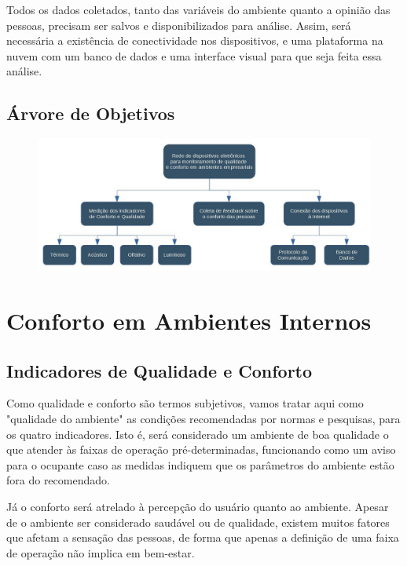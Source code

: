 \documentclass[]{politex}
\begin{document}
Todos os dados coletados, tanto das variáveis do ambiente quanto a opinião das pessoas, precisam ser salvos e disponibilizados para análise. Assim, será necessária a existência de conectividade nos dispositivos, e uma plataforma na nuvem com um banco de dados e uma interface visual para que seja feita essa análise. 

\chapter{Árvore de Objetivos} 

\begin{figure}[h]
\includegraphics[width=\textwidth]{objective_tree}
\end{figure}

\part{Conforto em Ambientes Internos} %

\chapter{Indicadores de Qualidade e Conforto} %


Como qualidade e conforto são termos subjetivos, vamos tratar aqui como "qualidade do ambiente" as condições recomendadas por normas e pesquisas, para os quatro indicadores. Isto é, será considerado um ambiente de boa qualidade o que atender às faixas de operação pré-determinadas, funcionando como um aviso para o ocupante caso as medidas indiquem que os parâmetros do ambiente estão fora do recomendado. 

Já o conforto será atrelado à percepção do usuário quanto ao ambiente. Apesar de o ambiente ser considerado saudável ou de qualidade, existem muitos fatores que afetam a sensação das pessoas, de forma que apenas a definição de uma faixa de operação não implica em bem-estar. 
\end{document}
